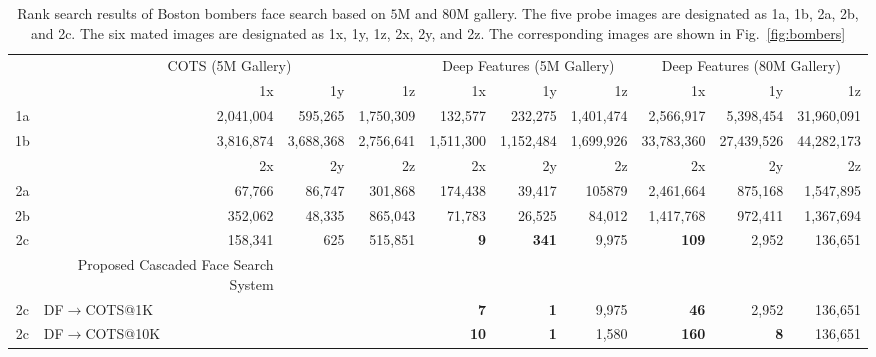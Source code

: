 \documentclass[10pt,journal,compsoc]{IEEEtran}
\begin{document}
\begin{table*}[htbp]
\scriptsize
\centering
\caption{Rank search results of Boston bombers face search based on $5$M and $80$M gallery. The five probe images are designated as 1a, 1b, 2a, 2b, and 2c. The six mated images are designated as 1x, 1y, 1z, 2x, 2y, and 2z. The corresponding images are shown in Fig.~\ref{fig:bombers}}\label{tab:bomber}
\begin{tabular}{crrr|rrr|rrr}
\toprule
\multicolumn{1}{c|}{} & \multicolumn{3}{c|}{COTS (5M Gallery)} & \multicolumn{3}{c|}{Deep Features (5M Gallery)} & \multicolumn{3}{c}{Deep Features (80M Gallery)}\\
\cmidrule{2-10}
\multicolumn{1}{c|}{} & 1x & 1y & 1z & 1x & 1y & 1z & 1x & 1y & 1z \\
\cmidrule{1-10}
\multicolumn{1}{c|}{1a}  & 2,041,004     & 595,265       & 1,750,309     & 132,577       & 232,275       & 1,401,474                & 2,566,917  & 5,398,454     & 31,960,091    \\
\multicolumn{1}{c|}{1b}  & 3,816,874     & 3,688,368     & 2,756,641     & 1,511,300     & 1,152,484     & 1,699,926                & 33,783,360 & 27,439,526    & 44,282,173    \\
\cmidrule{1-10}
\multicolumn{1}{c|}{} & 2x & 2y & 2z & 2x & 2y & 2z & 2x & 2y & 2z \\
\cmidrule{1-10}
\multicolumn{1}{c|}{2a}& 67,766        & 86,747        & 301,868       & 174,438       & 39,417        & 105879                 & 2,461,664  & 875,168       & 1,547,895     \\
\multicolumn{1}{c|}{2b} & 352,062       & 48,335        & 865,043       & 71,783        & 26,525        & 84,012                  & 1,417,768  & 972,411       & 1,367,694     \\
\multicolumn{1}{c|}{2c} & 158,341       & 625           & 515,851       & {\bf 9}       & {\bf 341}     & 9,975                   & {\bf 109}  & 2,952         & 136,651       \\
\cmidrule{1-10}
& Proposed Cascaded Face Search System\\
\cmidrule{1-10}
\multicolumn{1}{c|}{2c} & \multicolumn{3}{l|}{DF$\rightarrow$COTS@1K}   & {\bf  7}      & {\bf 1}       & 9,975 & {\bf 46}   & 2,952         & 136,651 \\
\multicolumn{1}{c|}{2c} & \multicolumn{3}{l|}{DF$\rightarrow$COTS@10K}  & {\bf 10}      & {\bf 1}       & 1,580 & {\bf 160}  & {\bf 8}       & 136,651 \\
\bottomrule
\end{tabular}
\end{table*}
\end{document}
